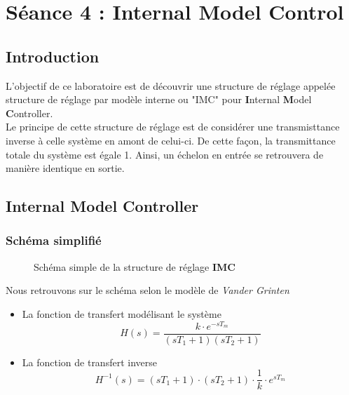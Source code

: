 \section{Séance 4 : Internal Model Control}
\subsection{Introduction}
L'objectif de ce laboratoire est de découvrir une structure de réglage appelée structure de réglage par modèle interne ou "IMC" pour \textbf{I}nternal \textbf{M}odel \textbf{C}ontroller.\\

Le principe de cette structure de réglage est de considérer une transmisttance inverse à celle système en amont de celui-ci. De cette façon, la transmittance totale du système est égale 1. Ainsi, un échelon en entrée se retrouvera de manière identique en sortie.\\

\subsection{Internal Model Controller}
\subsubsection{Schéma simplifié}
\begin{figure}[H]

\caption{Schéma simple de la structure de réglage \textbf{IMC}}
\end{figure}

Nous retrouvons sur le schéma selon le modèle de \textit{Vander Grinten}
\begin{itemize}
\item La fonction de transfert modélisant le système 
\begin{equation}
H(s) = \frac{k \cdot e^{-sT_{m}}}{(sT_{1} + 1)(sT_{2} + 1)} 
\end{equation}

\item La fonction de transfert inverse
\begin{equation}
H^{-1}(s) = (sT_{1} + 1) \cdot (sT_{2} + 1) \cdot \frac{1}{k}\cdot e^{sT_{m}}
\end{equation} 
\end{itemize}

